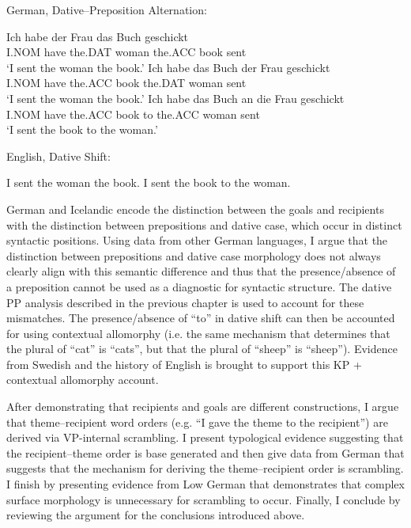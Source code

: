 \begin{exe}
	\ex German, Dative--Preposition Alternation: \label{ex:german-forms}
	\begin{xlist}
		\ex \label{ex:german-1} \gll Ich habe der Frau das Buch geschickt\\
			I.NOM have the.DAT woman the.ACC book sent\\
			 \trans `I sent the woman the book.'
		 \ex \label{ex:german-2} \gll Ich habe das Buch der Frau geschickt\\
			 I.NOM have the.ACC book the.DAT woman sent\\
			 \trans `I sent the woman the book.'
		 \ex \label{ex:german-3} \gll Ich habe das Buch an die Frau geschickt\\
			 I.NOM have the.ACC book to the.ACC woman sent\\
			 \trans `I sent the book to the woman.'
	\end{xlist}
	\ex English, Dative Shift: \label{ex:dat-shift}
	\begin{xlist}
		\ex \label{ex:english-1} I sent the woman the book.
		\ex \label{ex:english-2} I sent the book to the woman.
	\end{xlist}
\end{exe}

German and Icelandic encode the distinction between the goals and recipients with the distinction between prepositions and dative case, which occur in distinct syntactic positions. Using data from other German languages, I argue that the distinction between prepositions and dative case morphology does not always clearly align with this semantic difference and thus that the presence/absence of a preposition cannot be used as a diagnostic for syntactic structure. The dative PP analysis described in the previous chapter is used to account for these mismatches. The presence/absence of ``to'' in dative shift can then be accounted for using contextual allomorphy (i.e. the same mechanism that determines that the plural of ``cat'' is ``cats'', but that the plural of ``sheep'' is ``sheep''). Evidence from Swedish and the history of English is brought to support this KP + contextual allomorphy account.

After demonstrating that recipients and goals are different constructions, I argue that theme--recipient word orders (e.g. ``I gave the theme to the recipient'') are derived via VP-internal scrambling. I present typological evidence suggesting that the recipient--theme order is base generated and then give data from German that suggests that the mechanism for deriving the theme--recipient order is scrambling. I finish by presenting evidence from Low German that demonstrates that complex surface morphology is unnecessary for scrambling to occur. Finally, I conclude by reviewing the argument for the conclusions introduced above.

